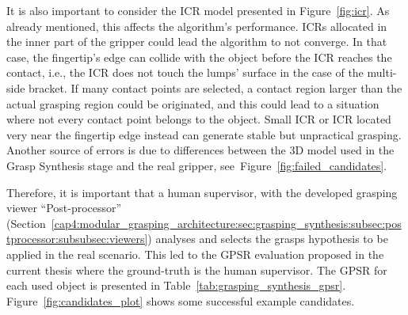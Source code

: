 It is also important to consider the \ac{ICR} model presented in Figure~\ref{fig:icr}. As already mentioned, this affects the algorithm's performance. \ac{ICR}s allocated in the inner part of the gripper could lead the algorithm to not converge. In that case, the fingertip's edge can collide with the object before the \ac{ICR} reaches the contact,  i.e., the \ac{ICR} does not touch the lumps' surface in the case of the multi-side bracket. If many contact points are selected, a contact region larger than the actual grasping region could be originated, and this could lead to a situation where not every contact point belongs to the object. Small \ac{ICR} or \ac{ICR} located very near the fingertip edge instead can generate stable but unpractical grasping. Another source of errors is due to differences between the 3D model used in the Grasp Synthesis stage and the real gripper, see~Figure~\ref{fig:failed_candidates}.

\begin{figure}[h!]
\end{figure}

Therefore, it is important that a human supervisor, with the developed grasping viewer ``Post-processor'' (Section~\ref{cap4:modular_grasping_architecture:sec:grasping_synthesis:subsec:postprocessor:subsubsec:viewers}) analyses and selects the grasps hypothesis to be applied in the real scenario. This led to the \acl{GPSR} evaluation proposed in the current thesis where the ground-truth is the human supervisor. The \ac{GPSR} for each used object is presented in Table~\ref{tab:grasping_synthesis_gpsr}. Figure~\ref{fig:candidates_plot} shows some successful example candidates.

